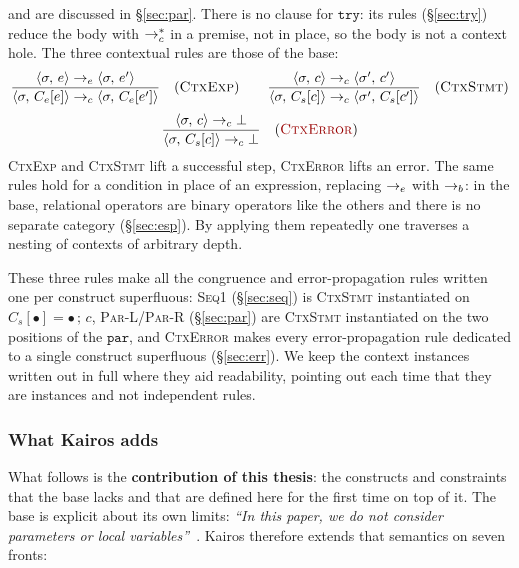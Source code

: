 and are discussed in \S\ref{sec:par}. There is no clause for
$\mathtt{try}$: its rules (\S\ref{sec:try}) reduce the body with
$\toc^{*}$ in a premise, not in place, so the body is not a context
hole. The three contextual rules are those of the base:
\[
\dfrac{\cfg{e}{\sigma} \toe \cfg{e'}{\sigma}}
      {\cfg{C_e[e]}{\sigma} \toc \cfg{C_e[e']}{\sigma}} \rname{CtxExp}
\qquad
\dfrac{\cfg{c}{\sigma} \toc \cfg{c'}{\sigma'}}
      {\cfg{C_s[c]}{\sigma} \toc \cfg{C_s[c']}{\sigma'}} \rname{CtxStmt}
\]
\[
\dfrac{\cfg{c}{\sigma} \toc \bot}
      {\cfg{C_s[c]}{\sigma} \toc \bot} \rnameerr{CtxError}
\]
\textsc{CtxExp} and \textsc{CtxStmt} lift a successful step,
\textsc{CtxError} lifts an error. The same rules hold for a
condition in place of an expression, replacing $\toe$ with $\tob$: in the
base, relational operators are binary operators like the others and there is
no separate category (\S\ref{sec:esp}). By applying them repeatedly one
traverses a nesting of contexts of arbitrary depth.

\medskip
\noindent
These three rules make all the congruence and error-propagation rules
written one per construct superfluous: \textsc{Seq1}
(\S\ref{sec:seq}) is \textsc{CtxStmt} instantiated on $C_s[\bullet] =
\bullet\,;\,c$, \textsc{Par-L}/\textsc{Par-R} (\S\ref{sec:par}) are
\textsc{CtxStmt} instantiated on the two positions of the $\mathtt{par}$, and
\textsc{CtxError} makes every error-propagation rule dedicated to a single
construct superfluous (\S\ref{sec:err}).
We keep the context instances written out in full where they aid
readability, pointing out each time that they are instances and not
independent rules.

\subsubsection*{What Kairos adds}

What follows is the \textbf{contribution of this thesis}: the constructs and
constraints that the base lacks and that are defined here for the first time on top
of it. The base is explicit about its own limits:
\emph{``In this paper, we do not consider parameters or local
variables''}~\cite{LamiLaneseStefani2024}. Kairos therefore extends that
semantics on seven fronts:

